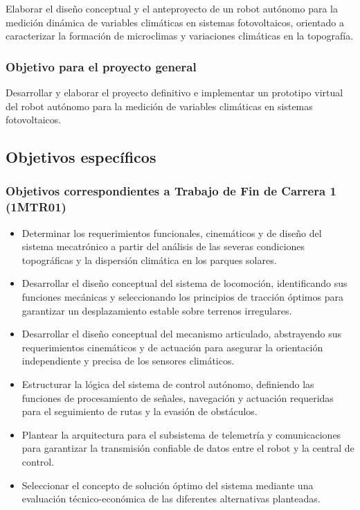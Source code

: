 Elaborar el diseño conceptual y el anteproyecto de un robot autónomo para la medición dinámica de variables climáticas en sistemas fotovoltaicos, orientado a caracterizar la formación de microclimas y variaciones climáticas en la topografía.


\subsubsection{Objetivo para el proyecto general}
Desarrollar y elaborar el proyecto definitivo e implementar un prototipo virtual del robot autónomo para la medición de variables climáticas en sistemas fotovoltaicos.

\subsection{Objetivos específicos}

\subsubsection{Objetivos correspondientes a Trabajo de Fin de Carrera 1 (1MTR01)}
\begin{itemize}
    \item Determinar los requerimientos funcionales, cinemáticos y de diseño del sistema mecatrónico a partir del análisis de las severas condiciones topográficas y la dispersión climática en los parques solares.
    
    \item Desarrollar el diseño conceptual del sistema de locomoción, identificando sus funciones mecánicas y seleccionando los principios de tracción óptimos para garantizar un desplazamiento estable sobre terrenos irregulares.
    \item Desarrollar el diseño conceptual del mecanismo articulado, abstrayendo sus requerimientos cinemáticos y de actuación para asegurar la orientación independiente y precisa de los sensores climáticos.
    \item Estructurar la lógica del sistema de control autónomo, definiendo las funciones de procesamiento de señales, navegación y actuación requeridas para el seguimiento de rutas y la evasión de obstáculos.
    \item Plantear la arquitectura para el subsistema de telemetría y comunicaciones para garantizar la transmisión confiable de datos entre el robot y la central de control.
    \item Seleccionar el concepto de solución óptimo del sistema mediante una evaluación técnico-económica de las diferentes alternativas planteadas.
\end{itemize}

